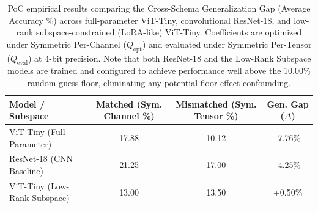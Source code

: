 \begin{table}[t]
\caption{PoC empirical results comparing the Cross-Schema Generalization Gap (Average Accuracy \%) across full-parameter ViT-Tiny, convolutional ResNet-18, and low-rank subspace-constrained (LoRA-like) ViT-Tiny. Coefficients are optimized under Symmetric Per-Channel ($Q_{\text{opt}}$) and evaluated under Symmetric Per-Tensor ($Q_{\text{eval}}$) at 4-bit precision. Note that both ResNet-18 and the Low-Rank Subspace models are trained and configured to achieve performance well above the 10.00\% random-guess floor, eliminating any potential floor-effect confounding.}
\label{tab:poc_extensions}
\vskip 0.15in
\begin{center}
\begin{small}
\begin{sc}
\begin{tabular}{lccc}
\toprule
Model / Subspace & Matched (Sym. Channel \%) & Mismatched (Sym. Tensor \%) & \textbf{Gen. Gap ($\Delta$)} \\
\midrule
ViT-Tiny (Full Parameter) & 17.88 & 10.12 & -7.76\% \\
ResNet-18 (CNN Baseline) & 21.25 & 17.00 & -4.25\% \\
ViT-Tiny (Low-Rank Subspace) & 13.00 & 13.50 & +0.50\% \\
\bottomrule
\end{tabular}
\end{sc}
\end{small}
\end{center}
\vskip -0.1in
\end{table}

